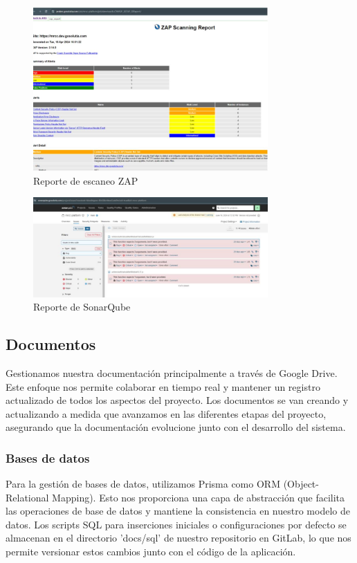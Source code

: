 \begin{figure}[H]
    \centering
    \includegraphics[width=0.8\textwidth]{../imagenes/secciones/7-Gestion-de-la-configuracion/ZAP Scan Report.jpg}
    \caption{Reporte de escaneo ZAP}
    \label{fig:zap}
\end{figure}

\begin{figure}[H]
    \centering
    \includegraphics[width=0.8\textwidth]{../imagenes/secciones/7-Gestion-de-la-configuracion/SonaQube report.jpg}
    \caption{Reporte de SonarQube}
    \label{fig:sonarqube}
\end{figure}


\subsection{Documentos}
Gestionamos nuestra documentación principalmente a través de Google Drive. Este enfoque nos permite colaborar en tiempo 
real y mantener un registro actualizado de todos los aspectos del proyecto. Los documentos se van creando y actualizando 
a medida que avanzamos en las diferentes etapas del proyecto, asegurando que la documentación evolucione junto con el 
desarrollo del sistema.

\subsubsection{Bases de datos}
Para la gestión de bases de datos, utilizamos Prisma como ORM (Object-Relational Mapping). Esto nos proporciona una capa de 
abstracción que facilita las operaciones de base de datos y mantiene la consistencia en nuestro modelo de datos. Los scripts SQL 
para inserciones iniciales o configuraciones por defecto se almacenan en el directorio 'docs/sql' de nuestro repositorio en GitLab, 
lo que nos permite versionar estos cambios junto con el código de la aplicación.